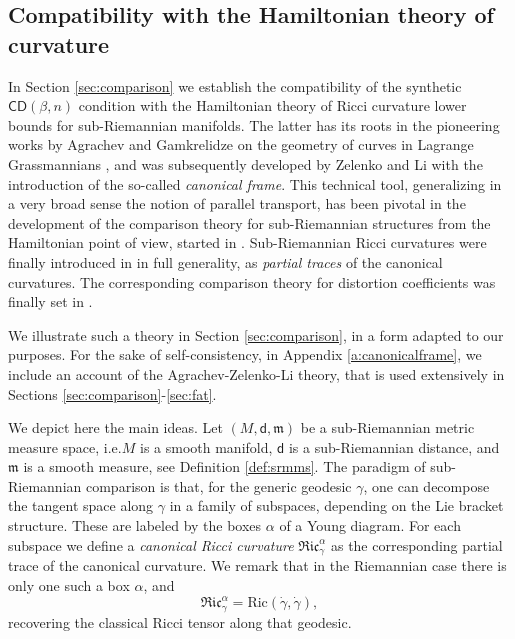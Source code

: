 \documentclass[11pt,a4paper]{article}
\theoremstyle{plain}
\theoremstyle{definition}
\theoremstyle{remark}
\numberwithin{equation}{section}
\newcommand{\CD}{\mathsf{CD}}
\newcommand{\Ric}{\mathrm{Ric}}
\newcommand{\mm}{\mathfrak m}
\newcommand{\sfd}{\mathsf d}
\begin{document}
\subsection*{Compatibility with the Hamiltonian theory of curvature}

In Section \ref{sec:comparison} we establish the compatibility of the synthetic $\CD(\beta,n)$ condition with the Hamiltonian theory of Ricci curvature lower bounds for sub-Riemannian manifolds. The latter has its roots in the pioneering works by Agrachev and Gamkrelidze on the geometry of curves in Lagrange Grassmannians \cite{AG1,AG2}, and was subsequently developed by Zelenko and Li \cite{ZeLi} with the introduction of the so-called \emph{canonical frame}. This technical tool, generalizing in a very broad sense the notion of parallel transport, has been pivotal in the development of the comparison theory for sub-Riemannian structures from the Hamiltonian point of view, started in \cite{ZeLi2,AAPL-Ricci,LeeLiZel-Sasakian}. Sub-Riemannian Ricci curvatures were finally introduced in \cite{BR-comparison} in full generality, as \emph{partial traces} of the canonical curvatures. The corresponding comparison theory for distortion coefficients was finally set in \cite{BRMathAnn}.

We illustrate such a theory in Section \ref{sec:comparison}, in a form adapted to our purposes. For the sake of self-consistency, in Appendix \ref{a:canonicalframe}, we include an account of the Agrachev-Zelenko-Li theory, that is used extensively in Sections \ref{sec:comparison}-\ref{sec:fat}.

We depict here the main ideas. Let $(M,\sfd,\mm)$ be a sub-Riemannian metric measure space, i.e.\@ $M$ is a smooth manifold, $\sfd$ is a sub-Riemannian distance, and $\mm$ is a smooth measure, see Definition \ref{def:srmms}. The paradigm of sub-Riemannian comparison is that, for the generic geodesic $\gamma$, one can decompose the tangent space along $\gamma$ in a family of subspaces, depending on the Lie bracket structure. These are labeled by the boxes $\alpha$ of a Young diagram. For each subspace we define a \emph{canonical Ricci curvature} $\mathfrak{Ric}^\alpha_\gamma$ as the corresponding partial trace of the canonical curvature. We remark that in the Riemannian case there is only one such a box $\alpha$, and
\begin{equation}
\mathfrak{Ric}^\alpha_{\gamma} = \Ric(\dot\gamma,\dot\gamma),
\end{equation}
recovering the classical Ricci tensor along that geodesic.
\end{document}
